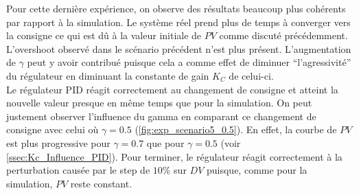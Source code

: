 Pour cette dernière expérience, on observe des résultats beaucoup plus cohérents par rapport à la simulation. Le système réel prend plus de temps à converger
vers la consigne ce qui est dû à la valeur initiale de $PV$ comme discuté précédemment. L'overshoot observé dans le scénario précédent n'est plus présent.
L'augmentation de $\gamma$ peut y avoir contribué puisque cela a comme effet de diminuer ``l'agressivité'' du régulateur en diminuant la constante de gain $K_C$ de celui-ci.
\\Le régulateur PID réagit correctement au changement de consigne et atteint la nouvelle valeur presque en même temps que pour la simulation. 
On peut justement observer l'influence du gamma en comparant ce changement de consigne avec celui où $\gamma = 0.5$ (\ref{fig:exp_scenario5_0.5}). En effet,
la courbe de $PV$ est plus progressive pour $\gamma = 0.7$ que pour $\gamma = 0.5$ (voir \ref{ssec:Kc_Influence_PID}).
Pour terminer, le régulateur réagit correctement à la perturbation causée par le step de $10\%$ sur $DV$ puisque, comme pour la simulation, $PV$ reste constant.
